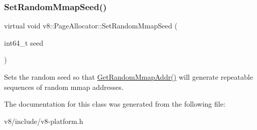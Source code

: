 \subsubsection{\texorpdfstring{Set\+Random\+Mmap\+Seed()}{SetRandomMmapSeed()}}
{\footnotesize\ttfamily virtual void v8\+::\+Page\+Allocator\+::\+Set\+Random\+Mmap\+Seed (\begin{DoxyParamCaption}\item[{int64\+\_\+t}]{seed }\end{DoxyParamCaption})\hspace{0.3cm}{\ttfamily [pure virtual]}}

Sets the random seed so that \mbox{\hyperlink{classv8_1_1PageAllocator_a37f194f9c5fdbe5105476cbd1432418c}{Get\+Random\+Mmap\+Addr()}} will generate repeatable sequences of random mmap addresses. 

The documentation for this class was generated from the following file\+:\begin{DoxyCompactItemize}
\item 
v8/include/v8-\/platform.\+h\end{DoxyCompactItemize}
